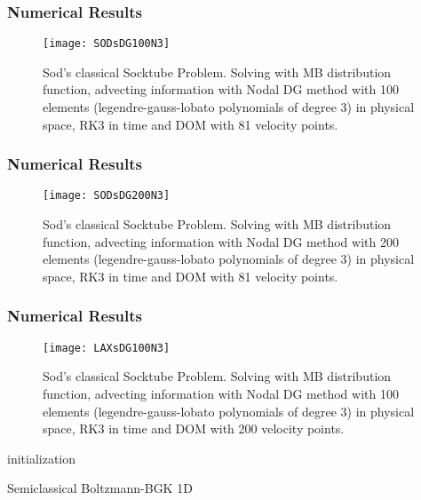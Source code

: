 
\begin{frame}
	\frametitle{Numerical Results}
			
		\begin{figure}
			\centering
				\texttt{[image: SODsDG100N3]}
			\caption{Sod's classical Socktube Problem. Solving with MB distribution function, advecting information with Nodal DG method with 100 elements (legendre-gauss-lobato polynomials of degree 3) in physical space, RK3 in time and DOM with 81 velocity points.}
			\label{fig:SODsDG100N3}
		\end{figure}
	
\end{frame}

\begin{frame}
	\frametitle{Numerical Results}
			
		\begin{figure}
			\centering
				\texttt{[image: SODsDG200N3]}
			\caption{Sod's classical Socktube Problem. Solving with MB distribution function, advecting information with Nodal DG method with 200 elements (legendre-gauss-lobato polynomials of degree 3) in physical space, RK3 in time and DOM with 81 velocity points.}
			\label{fig:SODsDG200N3}
		\end{figure}
	
\end{frame}

\begin{frame}
	\frametitle{Numerical Results}
			
		\begin{figure}
			\centering
				\texttt{[image: LAXsDG100N3]}
			\caption{Sod's classical Socktube Problem. Solving with MB distribution function, advecting information with Nodal DG method with 100 elements (legendre-gauss-lobato polynomials of degree 3) in physical space, RK3 in time and DOM with 200 velocity points.}
			\label{fig:LAXsDG100N3}
		\end{figure}
	
\end{frame}

\begin{frame}[allowframebreaks]

	\begin{algorithm}[H]
	\SetAlgoLined
	\BlankLine
		
	initialization\;
	 	
	 \caption{Semiclassical Boltzmann-BGK 1D}
	\end{algorithm}
\end{frame}